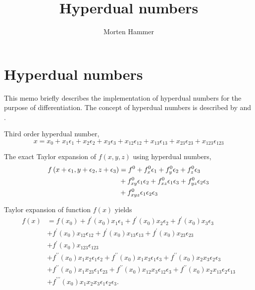 \documentclass[english]{../thermomemo/thermomemo}
\title{Hyperdual numbers}
\author{Morten Hammer}
\newcommand*{\lb}{\ensuremath{\left(}}
\newcommand*{\rb}{\ensuremath{\right)}}
\begin{document}
\frontmatter

\section{Hyperdual numbers}
This memo briefly describes the implementation of hyperdual numbers
for the purpose of differentiation. The concept of hyperdual numbers
is described by \citet{Rehner2021} and \citet{Fike2011}.

Third order hyperdual number,
\begin{equation}
  x = x_0 + x_1 \epsilon_1 + x_2 \epsilon_2 + x_3 \epsilon_3 + x_{12} \epsilon_{12} + x_{13} \epsilon_{13} + x_{23} \epsilon_{23} + x_{123} \epsilon_{123}
\end{equation}

The exact Taylor expansion of $f(x,y,z)$ using hyperdual numbers,
\begin{align}
  f \lb x + \epsilon_1, y + \epsilon_2, z + \epsilon_3  \rb &= f^0 + f_x^0 \epsilon_1 + f_y^0 \epsilon_2 + f_z^0 \epsilon_3 \nonumber \\&
  + f_{xy}^0 \epsilon_1 \epsilon_2 + f_{xz}^0 \epsilon_1 \epsilon_3 + f_{yz}^0 \epsilon_2 \epsilon_3 \nonumber \\&
  + f_{xyz}^0 \epsilon_1 \epsilon_2 \epsilon_3
\end{align}

Taylor expansion of function $f(x)$ yields
\begin{align}
  f(x) &=  f(x_0) + f^\prime (x_0) x_1 \epsilon_1 + f^\prime (x_0)x_2 \epsilon_2 + f^\prime (x_0)x_3 \epsilon_3 \nonumber \\
       &+ f^\prime (x_0) x_{12} \epsilon_{12} + f^\prime (x_0) x_{13} \epsilon_{13} + f^\prime (x_0) x_{23} \epsilon_{23} \nonumber \\
       & + f^\prime (x_0)x_{123} \epsilon_{123} \nonumber \\
       & + f^{\prime\prime} (x_0) x_1 x_2 \epsilon_1 \epsilon_2 + f^{\prime\prime} (x_0)x_1 x_3 \epsilon_1 \epsilon_3 + f^{\prime\prime} (x_0)x_2x_3 \epsilon_2  \epsilon_3 \nonumber \\
       & + f^{\prime\prime} (x_0) x_1 x_{23} \epsilon_1 \epsilon_{23} + f^{\prime\prime} (x_0)x_{12} x_3 \epsilon_{12} \epsilon_3 + f^{\prime\prime} (x_0)x_2x_{13} \epsilon_2  \epsilon_{13} \nonumber \\
       & + f^{\prime\prime\prime} (x_0) x_1 x_2 x_3 \epsilon_1 \epsilon_2 \epsilon_3 .
\end{align}
\end{document}
